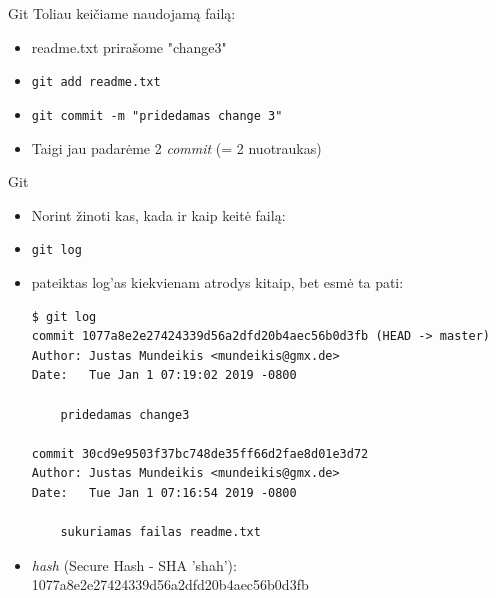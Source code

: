 \documentclass[11pt,xcolor=table]{beamer}
\begin{document}

\begin{frame}[fragile]{Git}
Toliau keičiame naudojamą failą:
\begin{itemize}
\item readme.txt prirašome "change3"
\item \colorbox{listinggray}{\lstinline|git add readme.txt|}
\item \colorbox{listinggray}{\lstinline|git commit -m "pridedamas change 3"|}
\item Taigi jau padarėme 2 \textit{commit} (= 2 nuotraukas)
\end{itemize}
\end{frame}

\begin{frame}[fragile]{Git}
\begin{itemize}
\item Norint žinoti kas, kada ir kaip keitė failą: 
\item \colorbox{listinggray}{\lstinline|git log|}
\item pateiktas log'as kiekvienam atrodys kitaip, bet esmė ta pati:
\begin{lstlisting}
$ git log
commit 1077a8e2e27424339d56a2dfd20b4aec56b0d3fb (HEAD -> master)
Author: Justas Mundeikis <mundeikis@gmx.de>
Date:   Tue Jan 1 07:19:02 2019 -0800

    pridedamas change3

commit 30cd9e9503f37bc748de35ff66d2fae8d01e3d72
Author: Justas Mundeikis <mundeikis@gmx.de>
Date:   Tue Jan 1 07:16:54 2019 -0800

    sukuriamas failas readme.txt

\end{lstlisting}
\item \textit{hash} (Secure Hash - SHA 'shah'): 1077a8e2e27424339d56a2dfd20b4aec56b0d3fb
\end{itemize}
\end{frame}

\end{document}
